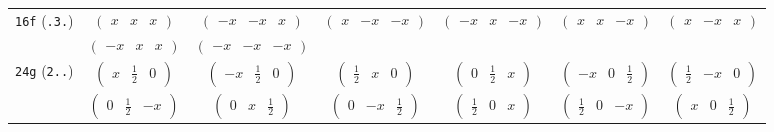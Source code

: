 \documentclass[fleqn,9pt,landscape]{jsarticle}
\begin{document}
\begin{center}
\begin{longtable}{ccccccc}
{\tt 16f} ({\tt .3.}) & $ \begin{pmatrix} x & x & x \end{pmatrix} $ & $ \begin{pmatrix} - x & - x & x \end{pmatrix} $ & $ \begin{pmatrix} x & - x & - x \end{pmatrix} $ & $ \begin{pmatrix} - x & x & - x \end{pmatrix} $ & $ \begin{pmatrix} x & x & - x \end{pmatrix} $ & $ \begin{pmatrix} x & - x & x \end{pmatrix} $ \\
& $ \begin{pmatrix} - x & x & x \end{pmatrix} $ & $ \begin{pmatrix} - x & - x & - x \end{pmatrix} $ & $  $ & $  $ & $  $ & $  $ \\ \hline
{\tt 24g} ({\tt 2..}) & $ \begin{pmatrix} x & \frac{1}{2} & 0 \end{pmatrix} $ & $ \begin{pmatrix} - x & \frac{1}{2} & 0 \end{pmatrix} $ & $ \begin{pmatrix} \frac{1}{2} & x & 0 \end{pmatrix} $ & $ \begin{pmatrix} 0 & \frac{1}{2} & x \end{pmatrix} $ & $ \begin{pmatrix} - x & 0 & \frac{1}{2} \end{pmatrix} $ & $ \begin{pmatrix} \frac{1}{2} & - x & 0 \end{pmatrix} $ \\
& $ \begin{pmatrix} 0 & \frac{1}{2} & - x \end{pmatrix} $ & $ \begin{pmatrix} 0 & x & \frac{1}{2} \end{pmatrix} $ & $ \begin{pmatrix} 0 & - x & \frac{1}{2} \end{pmatrix} $ & $ \begin{pmatrix} \frac{1}{2} & 0 & x \end{pmatrix} $ & $ \begin{pmatrix} \frac{1}{2} & 0 & - x \end{pmatrix} $ & $ \begin{pmatrix} x & 0 & \frac{1}{2} \end{pmatrix} $ \\ \hline

\end{longtable}
\end{center}
\end{document}
